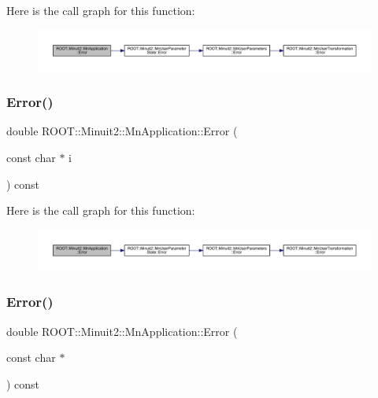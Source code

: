 Here is the call graph for this function\+:
\nopagebreak
\begin{figure}[H]
\begin{center}
\leavevmode
\includegraphics[width=350pt]{df/dd5/classROOT_1_1Minuit2_1_1MnApplication_aedc3775627672ba2038e8a26d6df13f1_cgraph}
\end{center}
\end{figure}
\mbox{\label{classROOT_1_1Minuit2_1_1MnApplication_a6997e4fd745e4048609c697f74c92eb8}} 
\subsubsection{\texorpdfstring{Error()}{Error()}\hspace{0.1cm}{\footnotesize\ttfamily [4/6]}}
{\footnotesize\ttfamily double R\+O\+O\+T\+::\+Minuit2\+::\+Mn\+Application\+::\+Error (\begin{DoxyParamCaption}\item[{const char $\ast$}]{i }\end{DoxyParamCaption}) const}

Here is the call graph for this function\+:
\nopagebreak
\begin{figure}[H]
\begin{center}
\leavevmode
\includegraphics[width=350pt]{df/dd5/classROOT_1_1Minuit2_1_1MnApplication_a6997e4fd745e4048609c697f74c92eb8_cgraph}
\end{center}
\end{figure}
\mbox{\label{classROOT_1_1Minuit2_1_1MnApplication_a6997e4fd745e4048609c697f74c92eb8}} 
\subsubsection{\texorpdfstring{Error()}{Error()}\hspace{0.1cm}{\footnotesize\ttfamily [5/6]}}
{\footnotesize\ttfamily double R\+O\+O\+T\+::\+Minuit2\+::\+Mn\+Application\+::\+Error (\begin{DoxyParamCaption}\item[{const char $\ast$}]{ }\end{DoxyParamCaption}) const}

